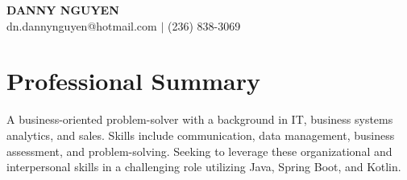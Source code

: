 \documentclass[letterpaper,11pt]{article}
\begin{document}
\begin{center}
\textbf{\Huge \scshape DANNY NGUYEN} \\ \vspace{1pt}
\small dn.dannynguyen@hotmail.com $|$ (236) 838-3069
\end{center}

\section{Professional Summary}
A business-oriented problem-solver with a background in IT, business systems analytics, and sales.  Skills include communication, data management, business assessment, and problem-solving. Seeking to leverage these organizational and interpersonal skills in a challenging role utilizing Java, Spring Boot, and Kotlin.
\end{document}
